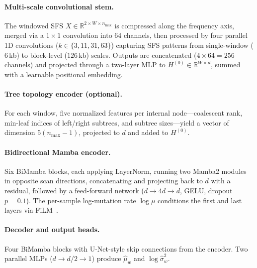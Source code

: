 \documentclass{article}
\begin{document}
\paragraph{Multi-scale convolutional stem.}
The windowed SFS $X \in \mathbb{R}^{2 \times W \times n_\mathrm{max}}$ is compressed along
the frequency axis, merged via a $1{\times}1$ convolution into 64 channels, then processed by
four parallel 1D convolutions ($k \in \{3, 11, 31, 63\}$) capturing SFS patterns from
single-window ($6$\,kb) to block-level ($126$\,kb) scales. Outputs are concatenated
($4 {\times} 64 = 256$ channels) and projected through a two-layer MLP to
$H^{(0)} \in \mathbb{R}^{W \times d}$, summed with a learnable positional embedding.

\paragraph{Tree topology encoder (optional).}
For each window, five normalized features per internal node---coalescent rank, min-leaf indices
of left/right subtrees, and subtree sizes---yield a vector of dimension
$5(n_\mathrm{max} {-} 1)$, projected to $d$ and added to $H^{(0)}$.

\paragraph{Bidirectional Mamba encoder.}
Six BiMamba blocks, each applying LayerNorm, running two Mamba2
modules~\citep{dao2024transformers} in opposite scan directions, concatenating and projecting
back to $d$ with a residual, followed by a feed-forward network ($d \to 4d \to d$, GELU,
dropout $p{=}0.1$). The per-sample log-mutation rate $\log\mu$ conditions the first and last
layers via FiLM~\citep{perez2018film}.

\paragraph{Decoder and output heads.}
Four BiMamba blocks with U-Net-style skip connections from the encoder. Two parallel MLPs
($d \to d/2 \to 1$) produce $\hat{\mu}_w$ and $\log\hat{\sigma}^2_w$.
\end{document}
